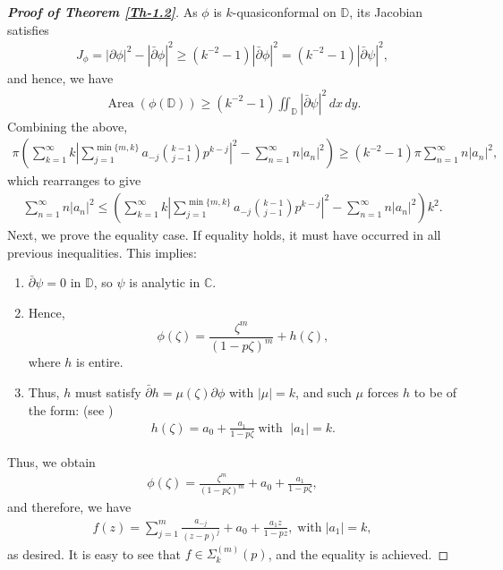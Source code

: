 \documentclass[a4paper,12pt]{amsart}
\theoremstyle{plain}
\theoremstyle{definition}
\begin{document}
\begin{proof}[\bf {Proof of Theorem \ref{Th-1.2}}]
\noindent As $\phi$ is $k$-quasiconformal on $\mathbb{D}$, its Jacobian satisfies
\begin{align*}
	J_\phi = |\partial \phi|^2 - |\bar{\partial} \phi|^2 \geq (k^{-2} - 1) |\bar{\partial} \phi|^2 = (k^{-2} - 1) |\bar{\partial} \psi|^2,
\end{align*}
and hence, we have
\begin{align*}
	\operatorname{Area}(\phi(\mathbb{D})) \geq (k^{-2} - 1) \iint_{\mathbb{D}} |\bar{\partial} \psi|^2 \, dx\,dy.
\end{align*}
Combining the above,
\begin{align*}
	\pi \left(\sum_{k=1}^{\infty} k \left| \sum_{j=1}^{\min\{m, k\}} a_{-j} \binom{k-1}{j-1} p^{k-j} \right|^2 - \sum_{n=1}^{\infty} n |a_{n}|^2  \right) \geq (k^{-2} - 1) \pi \sum_{n=1}^\infty n |a_n|^2,
\end{align*}
which rearranges to give
\begin{align*}
	\sum_{n=1}^\infty n |a_n|^2 \leq \left(\sum_{k=1}^{\infty} k \left| \sum_{j=1}^{\min\{m, k\}} a_{-j} \binom{k-1}{j-1} p^{k-j} \right|^2 - \sum_{n=1}^{\infty} n |a_{n}|^2 \right)k^2.
\end{align*}
Next, we prove the equality case. If equality holds, it must have occurred in all previous inequalities. This implies:
\begin{enumerate}
	\item [(i)] $\bar{\partial} \psi = 0$ in $\mathbb{D}$, so $\psi$ is analytic in $\mathbb{C}$.
	\item [(ii)] Hence, \[
	\phi(\zeta) = \frac{\zeta^{m}}{(1 - p\zeta)^{m}} + h(\zeta),	\] where $h$ is entire.
	\item [(iii)] Thus, $h$ must satisfy $\bar{\partial} h = \mu(\zeta) \partial \phi$ with $|\mu| = k$, and such $\mu$ forces $h$ to be of the form: (see \cite{Lehto-1971})
	\begin{align*}
	h(\zeta) = a_0 + \frac{a_1}{1 - p \zeta} \; \text{with }\; |a_1| = k.
	\end{align*}
\end{enumerate} Thus, we obtain
\begin{align*}
	\phi(\zeta) = \frac{\zeta^m}{(1 - p\zeta)^m} + a_0 + \frac{a_1}{1 - p\zeta},
\end{align*}
and therefore, we have
\begin{align*}
	f(z) = \sum_{j=1}^{m}\frac{a_{-j}}{(z-p)^j} + a_0 + \frac{a_1 z}{1 - pz},\; \text{with}\; |a_1| = k,
\end{align*}
as desired. It is easy to see that $f\in\Sigma_k^{(m)}(p)$, and the equality is achieved. 
\end{proof}
\end{document}
